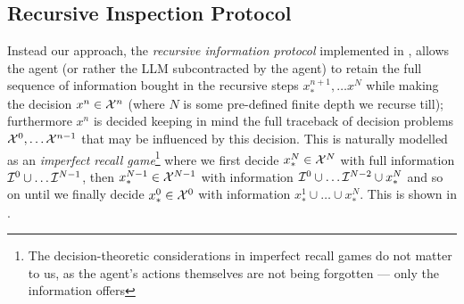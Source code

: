 





\subsection{Recursive Inspection Protocol}
\label{app:nonnaive}

Instead our approach, the \emph{recursive information protocol} implemented in , allows the agent (or rather the LLM subcontracted by the agent) to retain the full sequence of information bought in the recursive steps $x^{n+1}_*,\dots x^N$ while making the decision $x^n\in\mathcal{X}^n$ (where $N$ is some pre-defined finite depth we recurse till); furthermore $x^n$ is decided keeping in mind the full traceback of decision problems $\mathcal{X}^0,\dots\mathcal{X}^{n-1}$ that may be influenced by this decision. This is naturally modelled as an \emph{imperfect recall game}\footnote{The decision-theoretic considerations in imperfect recall games do not matter to us, as the agent's actions themselves are not being forgotten --- only the information offers}  where we first decide $x_*^N\in\mathcal{X}^N$ with full information $\mathcal{I}^0\cup\dots\mathcal{I}^{N-1}$, then $x_*^{N-1}\in\mathcal{X}^{N-1}$ with information $\mathcal{I}^0\cup\dots\mathcal{I}^{N-2}\cup x_*^{N}$ and so on until we finally decide $x_*^0\in\mathcal{X}^0$ with information $x_*^1\cup\dots \cup x_*^N$. This is shown in .

